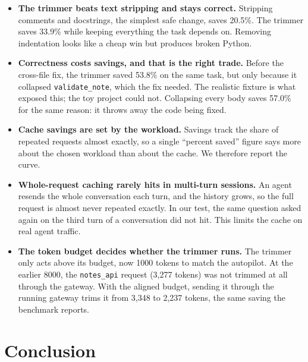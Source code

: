 \documentclass[12pt, a4paper, oneside]{report}
\newcommand{\code}[1]{\texttt{#1}}
\begin{document}
\begin{itemize}
    \item \textbf{The trimmer beats text stripping and stays correct.} Stripping
          comments and docstrings, the simplest safe change, saves 20.5\%. The
          trimmer saves 33.9\% while keeping everything the task depends on.
          Removing indentation looks like a cheap win but produces broken Python.
    \item \textbf{Correctness costs savings, and that is the right trade.} Before
          the cross-file fix, the trimmer saved 53.8\% on the same task, but only
          because it collapsed \code{validate\_note}, which the fix needed. The
          realistic fixture is what exposed this; the toy project could not.
          Collapsing every body saves 57.0\% for the same reason: it throws away
          the code being fixed.
    \item \textbf{Cache savings are set by the workload.} Savings track the share
          of repeated requests almost exactly, so a single ``percent saved'' figure
          says more about the chosen workload than about the cache. We therefore
          report the curve.
    \item \textbf{Whole-request caching rarely hits in multi-turn sessions.} An
          agent resends the whole conversation each turn, and the history grows,
          so the full request is almost never repeated exactly. In our test, the
          same question asked again on the third turn of a conversation did not
          hit. This limits the cache on real agent traffic.
    \item \textbf{The token budget decides whether the trimmer runs.} The trimmer
          only acts above its budget, now 1000 tokens to match the autopilot. At
          the earlier 8000, the \code{notes\_api} request (3,277 tokens) was not
          trimmed at all through the gateway. With the aligned budget, sending it
          through the running gateway trims it from 3,348 to 2,237 tokens, the
          same saving the benchmark reports.
\end{itemize}

\chapter{Conclusion}
\end{document}
